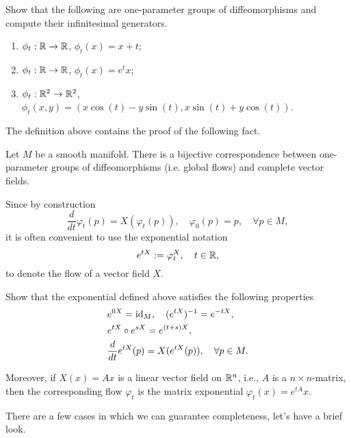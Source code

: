 \begin{exercise}
  Show that the following are one-parameter groups of diffeomorphisms and compute their infinitesimal generators.
  \begin{enumerate}
    \item $\phi_t:\mathbb{R}\to\mathbb{R}$, $\phi_t(x) = x + t$;
    \item $\phi_t:\mathbb{R}\to\mathbb{R}$, $\phi_t(x) = e^t x$;
    \item $\phi_t:\mathbb{R}^2\to\mathbb{R}^2$, $\phi_t(x,y) = (x\cos(t) - y\sin(t), x\sin(t)+y\cos(t))$.
  \end{enumerate}
\end{exercise}

The definition above contains the proof of the following fact.
\begin{proposition}
  Let $M$ be a smooth manifold. There is a bijective correspondence between one-parameter groups of diffeomorphisms (i.e. global flows) and complete vector fields.
\end{proposition}

\begin{notation}
  Since by construction
  \begin{equation}
    \frac{d}{d t}\varphi_t(p) = X(\varphi_t(p)), \quad
    \varphi_0(p) = p, \quad \forall p\in M,
  \end{equation}
  it is often convenient to use the exponential notation
  \begin{equation}
    e^{t X} := \varphi^X_t, \quad t\in\mathbb{R},
  \end{equation}
  to denote the flow of a vector field $X$.
\end{notation}

\begin{exercise}
  Show that the exponential defined above satisfies the following properties
  \begin{align}
     & e^{0X} = \operatorname{id}_M, \quad (e^{tX})^{-1} = e^{-tX},                 \\
     & e^{t X}\circ e^{s X}= e^{(t+s)X},                              \\
     & \frac{d}{d t} e^{tX} (p) = X(e^{tX}(p)), \quad \forall p\in M.
  \end{align}

  Moreover, if $X(x) = Ax$ is a linear vector field on $\mathbb{R}^n$, i.e., $A$ is a $n\times n$-matrix, then the corresponding flow $\varphi_t$ is the matrix exponential $\varphi_t(x) = e^{tA}x$.
\end{exercise}

There are a few cases in which we can guarantee completeness, let's have a brief look.

